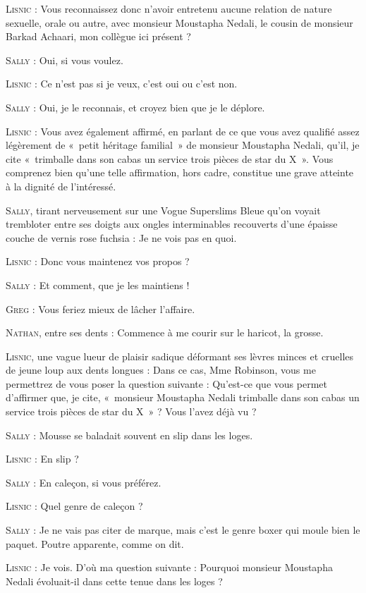 \begin{dialogue}
\textsc{Lisnic} : Vous reconnaissez donc n’avoir entretenu aucune relation de nature sexuelle, orale ou autre, avec monsieur Moustapha Nedali, le cousin de monsieur Barkad Achaari, mon collègue ici présent ?

\textsc{Sally} : Oui, si vous voulez.

\textsc{Lisnic} : Ce n’est pas si je veux, c’est oui ou c’est non.

\textsc{Sally} : Oui, je le reconnais, et croyez bien que je le déplore.

\textsc{Lisnic} : Vous avez également affirmé, en parlant de ce que vous avez qualifié assez légèrement de «~petit héritage familial~» de monsieur Moustapha Nedali, qu’il, je cite «~trimballe dans son cabas un service trois pièces de star du X~». Vous comprenez bien qu’une telle affirmation, hors cadre, constitue une grave atteinte à la dignité de l’intéressé.

\textsc{Sally}, tirant nerveusement sur une Vogue Superslims Bleue qu’on voyait trembloter entre ses doigts aux ongles interminables recouverts d’une épaisse couche de vernis rose fuchsia : Je ne vois pas en quoi.

\textsc{Lisnic} : Donc vous maintenez vos propos ?

\textsc{Sally} : Et comment, que je les maintiens !

\textsc{Greg} : Vous feriez mieux de lâcher l’affaire.

\textsc{Nathan}, entre ses dents : Commence à me courir sur le haricot, la grosse.

\textsc{Lisnic}, une vague lueur de plaisir sadique déformant ses lèvres minces et cruelles de jeune loup aux dents longues : Dans ce cas, Mme Robinson, vous me permettrez de vous poser la question suivante : Qu’est-ce que vous permet d’affirmer que, je cite, «~monsieur Moustapha Nedali trimballe dans son cabas un service trois pièces de star du X~» ? Vous l’avez déjà vu ?

\textsc{Sally} : Mousse se baladait souvent en slip dans les loges.

\textsc{Lisnic} : En slip ?

\textsc{Sally} : En caleçon, si vous préférez.

\textsc{Lisnic} : Quel genre de caleçon ?

\textsc{Sally} : Je ne vais pas citer de marque, mais c’est le genre boxer qui moule bien le paquet. Poutre apparente, comme on dit.

\textsc{Lisnic} : Je vois. D’où ma question suivante : Pourquoi monsieur Moustapha Nedali évoluait-il dans cette tenue dans les loges ?


\end{dialogue}
